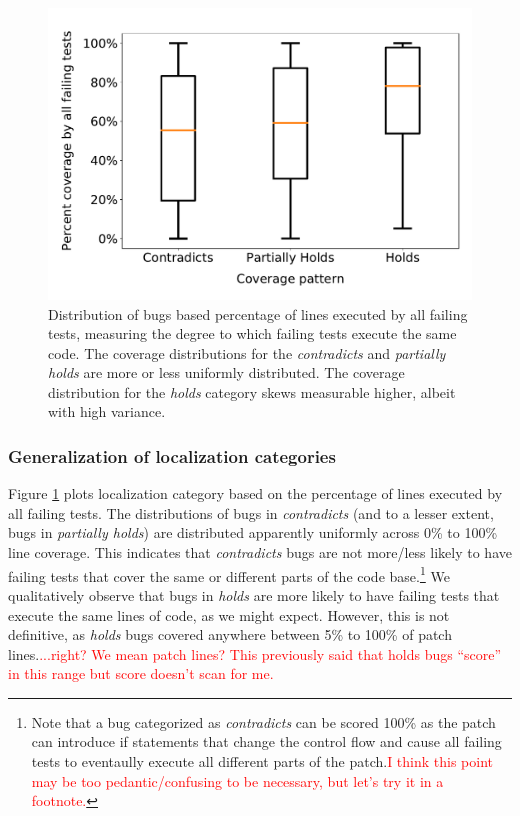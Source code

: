 \documentclass[10pt, conference]{IEEEtran}
\newcommand\todo[1]{\textcolor{red}{#1}}
\begin{document}
\begin{figure}
	\includegraphics[width=\linewidth,left]{img/coverage-buggy.pdf}
	\caption{\small	\label{fig:coverage-buggy} Distribution of bugs based percentage of lines 
	executed by all failing tests, measuring the degree to which failing tests execute the same 
	code. The coverage distributions for the \emph{contradicts} and \emph{partially holds} are more or 
	less uniformly distributed. The coverage
	distribution for the \emph{holds} category skews measurable higher, albeit with
        high variance.} %
\end{figure}

\subsubsection{Generalization of localization categories}
Figure \ref{fig:coverage-buggy} plots localization category based on the
percentage of lines executed by all failing tests. 
%
The distributions of bugs in \emph{contradicts} (and to a lesser extent, bugs in \emph{partially 
holds}) are 
distributed apparently uniformly across 0\% to 100\% line coverage. This indicates that \emph{contradicts} 
bugs are 
not more/less likely to have failing tests that cover the same or different parts of the code 
base.\footnote{Note that a bug categorized as \emph{contradicts} can be scored 100\% as the 
patch can introduce if statements that change the control flow and cause all failing tests to 
eventaully execute all different parts of the patch.\todo{I think this point may
  be too pedantic/confusing to be necessary, but let's try it in a footnote.}}
%
We qualitatively observe that bugs in \emph{holds} are more likely to have 
failing tests that execute the same lines of code, as we might expect. However, this is not 
definitive, as \emph{holds} bugs covered anywhere between 
5\% to 100\% of patch lines.\todo{...right? We mean patch lines? This previously
  said that holds bugs ``score'' in this range but score doesn't scan for me.}
\end{document}
